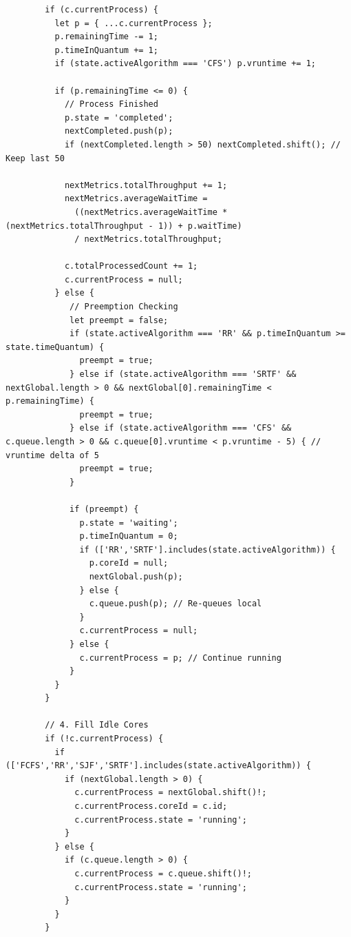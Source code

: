 \documentclass[a4paper]{article}
\begin{document}
\begin{lstlisting}
        if (c.currentProcess) {
          let p = { ...c.currentProcess };
          p.remainingTime -= 1;
          p.timeInQuantum += 1;
          if (state.activeAlgorithm === 'CFS') p.vruntime += 1;
          
          if (p.remainingTime <= 0) {
            // Process Finished
            p.state = 'completed';
            nextCompleted.push(p);
            if (nextCompleted.length > 50) nextCompleted.shift(); // Keep last 50
            
            nextMetrics.totalThroughput += 1;
            nextMetrics.averageWaitTime = 
              ((nextMetrics.averageWaitTime * (nextMetrics.totalThroughput - 1)) + p.waitTime) 
              / nextMetrics.totalThroughput;
            
            c.totalProcessedCount += 1;
            c.currentProcess = null;
          } else {
             // Preemption Checking
             let preempt = false;
             if (state.activeAlgorithm === 'RR' && p.timeInQuantum >= state.timeQuantum) {
               preempt = true;
             } else if (state.activeAlgorithm === 'SRTF' && nextGlobal.length > 0 && nextGlobal[0].remainingTime < p.remainingTime) {
               preempt = true;
             } else if (state.activeAlgorithm === 'CFS' && c.queue.length > 0 && c.queue[0].vruntime < p.vruntime - 5) { // vruntime delta of 5
               preempt = true;
             }

             if (preempt) {
               p.state = 'waiting';
               p.timeInQuantum = 0;
               if (['RR','SRTF'].includes(state.activeAlgorithm)) {
                 p.coreId = null;
                 nextGlobal.push(p);
               } else {
                 c.queue.push(p); // Re-queues local
               }
               c.currentProcess = null;
             } else {
               c.currentProcess = p; // Continue running
             }
          }
        }

        // 4. Fill Idle Cores
        if (!c.currentProcess) {
          if (['FCFS','RR','SJF','SRTF'].includes(state.activeAlgorithm)) {
            if (nextGlobal.length > 0) {
              c.currentProcess = nextGlobal.shift()!;
              c.currentProcess.coreId = c.id;
              c.currentProcess.state = 'running';
            }
          } else {
            if (c.queue.length > 0) {
              c.currentProcess = c.queue.shift()!;
              c.currentProcess.state = 'running';
            }
          }
        }
        

\end{lstlisting}
\end{document}
